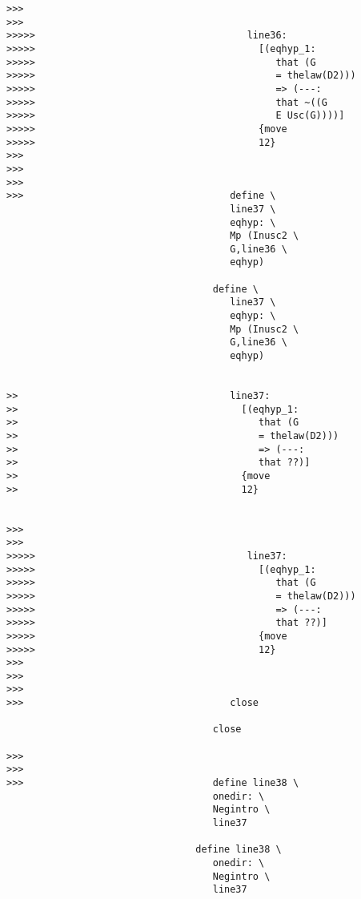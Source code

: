 \documentclass[12pt]{article}
\begin{document}
\begin{verbatim}
>>>
>>>
>>>>>                                     line36:
>>>>>                                       [(eqhyp_1:
>>>>>                                          that (G
>>>>>                                          = thelaw(D2)))
>>>>>                                          => (---:
>>>>>                                          that ~((G
>>>>>                                          E Usc(G))))]
>>>>>                                       {move
>>>>>                                       12}
>>>
>>>
>>>
>>>                                    define \
                                       line37 \
                                       eqhyp: \
                                       Mp (Inusc2 \
                                       G,line36 \
                                       eqhyp)

                                    define \
                                       line37 \
                                       eqhyp: \
                                       Mp (Inusc2 \
                                       G,line36 \
                                       eqhyp)


>>                                     line37:
>>                                       [(eqhyp_1:
>>                                          that (G
>>                                          = thelaw(D2)))
>>                                          => (---:
>>                                          that ??)]
>>                                       {move
>>                                       12}


>>>
>>>
>>>>>                                     line37:
>>>>>                                       [(eqhyp_1:
>>>>>                                          that (G
>>>>>                                          = thelaw(D2)))
>>>>>                                          => (---:
>>>>>                                          that ??)]
>>>>>                                       {move
>>>>>                                       12}
>>>
>>>
>>>
>>>                                    close

                                    close

>>>
>>>
>>>                                 define line38 \
                                    onedir: \
                                    Negintro \
                                    line37

                                 define line38 \
                                    onedir: \
                                    Negintro \
                                    line37



\end{verbatim}
\end{document}
